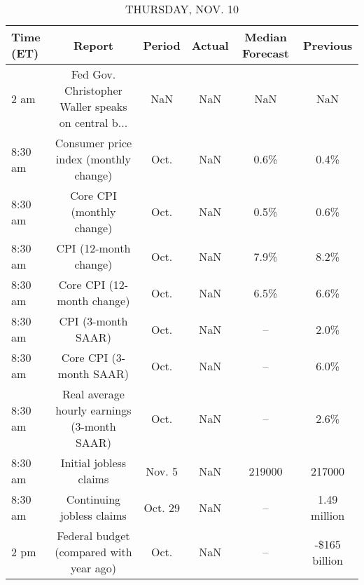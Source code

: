 \documentclass{article}%
\begin{document}
%


\begin{table}[htbp]%
\caption{THURSDAY, NOV. 10}%
\centering%
\begin{adjustbox}{width=1\textwidth}%
\begin{tabular}{lccccc}
\toprule
Time (ET) &                                             Report &  Period & Actual & Median Forecast &      Previous \\
\midrule
     2 am & Fed Gov. Christopher Waller speaks on central b... &     NaN &    NaN &             NaN &           NaN \\
  8:30 am &              Consumer price index (monthly change) &    Oct. &    NaN &            0.6\% &          0.4\% \\
  8:30 am &                          Core CPI (monthly change) &    Oct. &    NaN &            0.5\% &          0.6\% \\
  8:30 am &                              CPI (12-month change) &    Oct. &    NaN &            7.9\% &          8.2\% \\
  8:30 am &                         Core CPI (12-month change) &    Oct. &    NaN &            6.5\% &          6.6\% \\
  8:30 am &                                 CPI (3-month SAAR) &    Oct. &    NaN &              -- &          2.0\% \\
  8:30 am &                            Core CPI (3-month SAAR) &    Oct. &    NaN &              -- &          6.0\% \\
  8:30 am &        Real average hourly earnings (3-month SAAR) &    Oct. &    NaN &              -- &          2.6\% \\
  8:30 am &                             Initial jobless claims &  Nov. 5 &    NaN &          219000 &        217000 \\
  8:30 am &                          Continuing jobless claims & Oct. 29 &    NaN &              -- &  1.49 million \\
     2 pm &            Federal budget (compared with year ago) &    Oct. &    NaN &              -- & -\$165 billion \\
\bottomrule
\end{tabular}
%
\end{adjustbox}%
\end{table}

%
\end{document}
